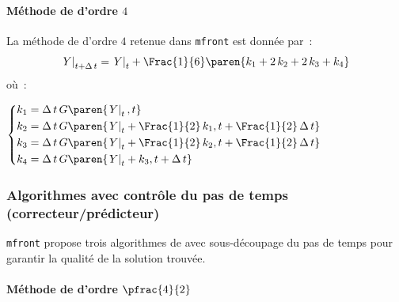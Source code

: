 \documentclass[rectoverso,pleiades,pstricks,leqno,anti]{texmf/note_technique_2010}
\newcommand{\mfront}{\texttt{mfront}}
\newcommand{\debutpas}[1]{\ensuremath{\left.#1\right|_{t}}}
\newcommand{\finpas}[1]{\ensuremath{\left.#1\right|_{t+\Delta\, t}}}
\begin{document}
\paragraph{Méthode de  d'ordre $4$}

La méthode de  d'ordre \(4\) retenue dans \mfront{} est
donnée par~:
\[
\finpas{Y} = \debutpas{Y}+\Frac{1}{6}\paren{k_{1}+2\,k_{2}+2\,k_{3}+k_{4}}
\]
où~:
\begin{minipage}[t]{0.9\linewidth}
  \(
  \left\{
  \begin{aligned}
    k_{1} &= \Delta\,t\,G\paren{\debutpas{Y},t}\\
    k_{2} &= \Delta\,t\,G\paren{\debutpas{Y}+\Frac{1}{2}\,k_{1},t+\Frac{1}{2}\,\Delta\,t}\\
    k_{3} &= \Delta\,t\,G\paren{\debutpas{Y}+\Frac{1}{2}\,k_{2},t+\Frac{1}{2}\,\Delta\,t}\\
    k_{4} &= \Delta\,t\,G\paren{\debutpas{Y}+k_{3},t+\Delta\,t}
  \end{aligned}
  \right.
  \)
\end{minipage}

\subsubsection{Algorithmes avec contrôle du pas de temps (correcteur/prédicteur)}

\mfront{} propose trois algorithmes de  avec
sous-découpage du pas de temps pour garantir la qualité de la solution
trouvée.

\paragraph{Méthode de  d'ordre $\pfrac{4}{2}$}
\end{document}
